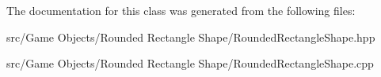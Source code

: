 \begin{DoxyCode}{0}

\end{DoxyCode}


The documentation for this class was generated from the following files\+:\begin{DoxyCompactItemize}
\item 
src/\+Game Objects/\+Rounded Rectangle Shape/Rounded\+Rectangle\+Shape.\+hpp\item 
src/\+Game Objects/\+Rounded Rectangle Shape/Rounded\+Rectangle\+Shape.\+cpp\end{DoxyCompactItemize}
